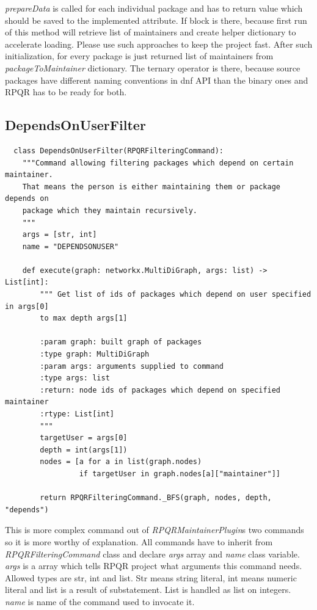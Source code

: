 \textit{prepareData} is called for each individual package and has to return value which should be
saved to the implemented attribute. If block is there, because first run of this method will retrieve
list of maintainers and create helper dictionary to accelerate loading. Please use such approaches
to keep the project fast. After such initialization, for every package is just returned list of maintainers
from \textit{packageToMaintainer} dictionary. The ternary operator is there, because source packages
have different naming conventions in dnf API than the binary ones and RPQR has to be ready for both.

\newpage

\subsection*{DependsOnUserFilter}

\begin{lstlisting}
  class DependsOnUserFilter(RPQRFilteringCommand):
    """Command allowing filtering packages which depend on certain maintainer.
    That means the person is either maintaining them or package depends on
    package which they maintain recursively.
    """
    args = [str, int]
    name = "DEPENDSONUSER"

    def execute(graph: networkx.MultiDiGraph, args: list) -> List[int]:
        """ Get list of ids of packages which depend on user specified in args[0]
        to max depth args[1]

        :param graph: built graph of packages
        :type graph: MultiDiGraph
        :param args: arguments supplied to command
        :type args: list
        :return: node ids of packages which depend on specified maintainer
        :rtype: List[int]
        """
        targetUser = args[0]
        depth = int(args[1])
        nodes = [a for a in list(graph.nodes)
                 if targetUser in graph.nodes[a]["maintainer"]]

        return RPQRFilteringCommand._BFS(graph, nodes, depth, "depends")
\end{lstlisting}

This is more complex command out of \textit{RPQRMaintainerPlugin}s two commands so it is more worthy of
explanation. All commands have to inherit from \textit{RPQRFilteringCommand} class and declare \textit{args}
array and \textit{name} class variable. \textit{args} is a array which tells RPQR project what arguments
this command needs. Allowed types are str, int and list. Str means string literal, int means numeric
literal and list is a result of substatement. List is handled as list on integers. \textit{name}
is name of the command used to invocate it.

